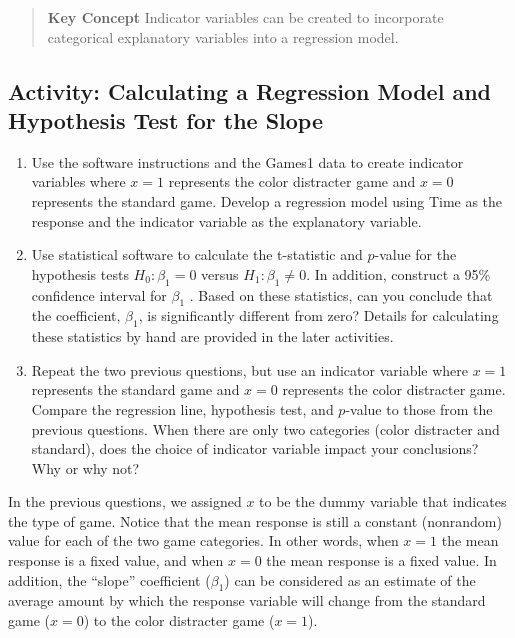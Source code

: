 \documentclass[
]{book}
\begin{document}
\begin{quote}
\textbf{Key Concept}
Indicator variables can be created to incorporate categorical explanatory variables into a regression model.
\end{quote}

\hypertarget{activity-calculating-a-regression-model-and-hypothesis-test-for-the-slope}{%
\subsection*{Activity: Calculating a Regression Model and Hypothesis Test for the Slope}\label{activity-calculating-a-regression-model-and-hypothesis-test-for-the-slope}}

\begin{enumerate}
\def\labelenumi{\arabic{enumi}.}
\setcounter{enumi}{10}
\item
  Use the software instructions and the Games1 data to create indicator variables where \(x = 1\) represents the color distracter game and \(x = 0\) represents the standard game. Develop a regression model using Time as the response and the indicator variable as the explanatory variable.
\item
  Use statistical software to calculate the t-statistic and \(p\)-value for the hypothesis tests \(H_0 : \beta_1 = 0\) versus \(H_1 : \beta_1 \ne 0\). In addition, construct a 95\% confidence interval for \(\beta_1\) . Based on these statistics, can you conclude that the coefficient, \(\beta_1\), is significantly different from zero? Details for calculating these statistics by hand are provided in the later activities.
\item
  Repeat the two previous questions, but use an indicator variable where \(x = 1\) represents the standard game and \(x = 0\) represents the color distracter game. Compare the regression line, hypothesis test, and \(p\)-value to those from the previous questions. When there are only two categories (color distracter and standard), does the choice of indicator variable impact your conclusions? Why or why not?
\end{enumerate}

In the previous questions, we assigned \(x\) to be the dummy variable that indicates the type of game. Notice that the mean response is still a constant (nonrandom) value for each of the two game categories. In other
words, when \(x = 1\) the mean response is a fixed value, and when \(x = 0\) the mean response is a fixed value. In addition, the ``slope'' coefficient (\(\beta_1\)) can be considered as an estimate of the average amount by which the response variable will change from the standard game (\(x = 0\)) to the color distracter game (\(x = 1\)).
\end{document}
